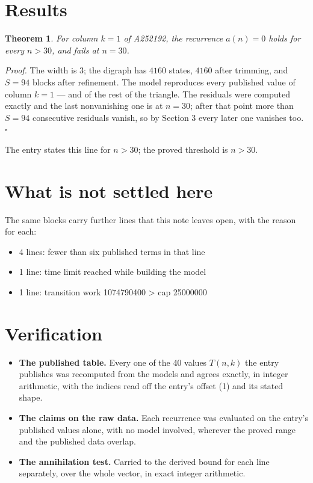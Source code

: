 \documentclass[11pt]{article}
\newtheorem{theorem}{Theorem}
\theoremstyle{definition}
\begin{document}
\section{Results}

\begin{theorem} For column $k = 1$ of A252192, the recurrence $a(n) = 0$ holds for every $n > 30$, and fails at $n = 30$.\end{theorem}

{\itshape Proof.} The width is $3$; the digraph has $4160$ states, $4160$ after trimming, and $S = 94$ blocks after refinement. The model reproduces every published value of column $k = 1$ --- and of the rest of the triangle. The residuals were computed exactly and the last nonvanishing one is at $n = 30$; after that point more than $S = 94$ consecutive residuals vanish, so by Section 3 every later one vanishes too. $\square$

The entry states this line for $n > 30$; the proved threshold is $n > 30$.

\section{What is not settled here}

The same blocks carry further lines that this note leaves open, with the reason for each:

\begin{itemize}

\item 4 lines: fewer than six published terms in that line

\item 1 line: time limit reached while building the model

\item 1 line: transition work 1074790400 > cap 25000000

\end{itemize}

\section{Verification}

\begin{itemize}

\item {\bfseries The published table.} Every one of the 40 values $T(n,k)$ the entry publishes was recomputed from the models and agrees exactly, in integer arithmetic, with the indices read off the entry's offset (1) and its stated shape.

\item {\bfseries The claims on the raw data.} Each recurrence was evaluated on the entry's published values alone, with no model involved, wherever the proved range and the published data overlap.

\item {\bfseries The annihilation test.} Carried to the derived bound for each line separately, over the whole vector, in exact integer arithmetic.

\end{itemize}
\end{document}

